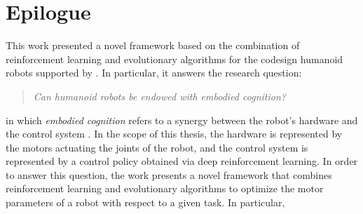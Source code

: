 \chapter*{Epilogue}
\label{chp:99-Epilogue}

This work presented a novel framework based on the combination of reinforcement learning and evolutionary algorithms for the codesign  humanoid robots supported by  . In particular, it answers the research question:

\begin{quote}
    \textit{
        Can humanoid robots be endowed with embodied cognition?}
\end{quote}

in which \textit{embodied cognition} refers to a synergy between the robot's hardware and the control system . In the scope of this thesis, the hardware is represented by the motors actuating the joints of the robot, and the control system is represented by a control policy obtained via deep reinforcement learning.
In order to answer this question, the work presents a novel framework that combines reinforcement learning and evolutionary algorithms to optimize the motor parameters of a robot with respect to a given task. In particular,

